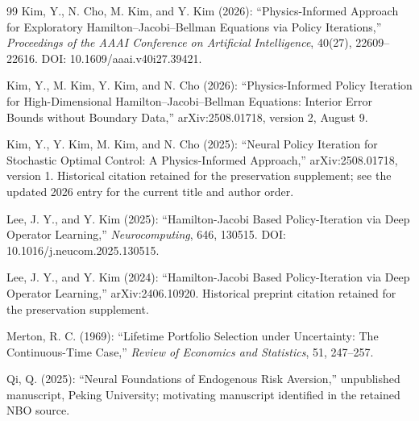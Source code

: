 \begin{thebibliography}{99}
 Kim, Y., N. Cho, M. Kim, and Y. Kim (2026): ``Physics-Informed Approach for Exploratory Hamilton--Jacobi--Bellman Equations via Policy Iterations,'' \emph{Proceedings of the AAAI Conference on Artificial Intelligence}, 40(27), 22609--22616. DOI: 10.1609/aaai.v40i27.39421.

 Kim, Y., M. Kim, Y. Kim, and N. Cho (2026): ``Physics-Informed Policy Iteration for High-Dimensional Hamilton--Jacobi--Bellman Equations: Interior Error Bounds without Boundary Data,'' arXiv:2508.01718, version 2, August 9.

 Kim, Y., Y. Kim, M. Kim, and N. Cho (2025): ``Neural Policy Iteration for Stochastic Optimal Control: A Physics-Informed Approach,'' arXiv:2508.01718, version 1. Historical citation retained for the preservation supplement; see the updated 2026 entry for the current title and author order.

 Lee, J. Y., and Y. Kim (2025): ``Hamilton-Jacobi Based Policy-Iteration via Deep Operator Learning,'' \emph{Neurocomputing}, 646, 130515. DOI: 10.1016/j.neucom.2025.130515.

 Lee, J. Y., and Y. Kim (2024): ``Hamilton-Jacobi Based Policy-Iteration via Deep Operator Learning,'' arXiv:2406.10920. Historical preprint citation retained for the preservation supplement.

 Merton, R. C. (1969): ``Lifetime Portfolio Selection under Uncertainty: The Continuous-Time Case,'' \emph{Review of Economics and Statistics}, 51, 247--257.

 Qi, Q. (2025): ``Neural Foundations of Endogenous Risk Aversion,'' unpublished manuscript, Peking University; motivating manuscript identified in the retained NBO source.

\end{thebibliography}
